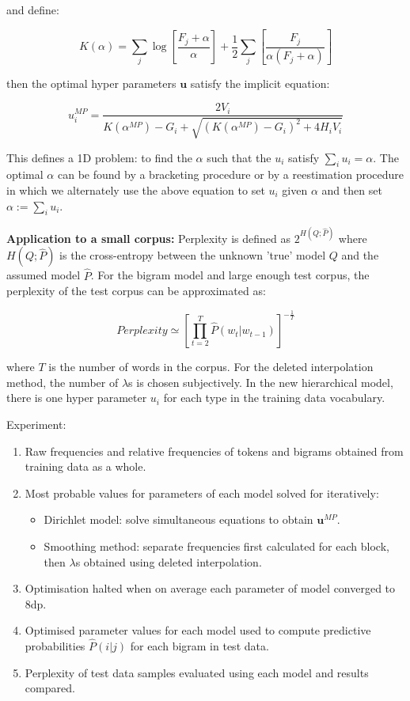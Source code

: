 \noindent and define:

\begin{equation}
K(\alpha)=\sum_{j}\log\left[\frac{F_{j}+\alpha}{\alpha}\right]+\frac{1}{2}\sum_{j}\left[\frac{F_{j}}{\alpha(F_{j}+\alpha)}\right]
\end{equation}

\noindent then the optimal hyper parameters $\boldsymbol{u}$ satisfy the implicit equation:

\begin{equation}
u_{i}^{MP}=\frac{2V_{i}}{K(\alpha^{MP})-G_{i}+\sqrt{(K(\alpha^{MP})-G_{i})^{2}+4H_{i}V_{i}}}
\end{equation}

\noindent This defines a 1D problem: to find the $\alpha$ such that the $u_{i}$ satisfy $\sum_{i}u_{i}=\alpha$. The optimal $\alpha$ can be found by a bracketing procedure or by a reestimation procedure in which we alternately use the above equation to set $u_{i}$ given $\alpha$ and then set $\alpha:=\sum_{i}u_{i}$.

\textbf{Application to a small corpus: } Perplexity is defined as $2^{H(Q;\hat{P})}$ where $H(Q;\hat{P})$ is the cross-entropy between the unknown 'true' model $Q$ and the assumed model $\hat{P}$. For the bigram model and large enough test corpus, the perplexity of the test corpus can be approximated as:

\begin{equation}
Perplexity\simeq\left[\prod_{t=2}^{T}\hat{P}(w_{t}|w_{t-1})\right]^{-\frac{1}{T}}
\end{equation}

\noindent where $T$ is the number of words in the corpus. For the deleted interpolation method, the number of $\lambda$s is chosen subjectively. In the new hierarchical model, there is one hyper parameter $u_{i}$ for each type in the training data vocabulary.

Experiment:
\begin{enumerate}
\item Raw frequencies and relative frequencies of tokens and bigrams obtained from training data as a whole.
\item Most probable values for parameters of each model solved for iteratively: 
\indent\begin{itemize}
 \item Dirichlet model: solve simultaneous equations to obtain $\boldsymbol{u}^{MP}$.
\item Smoothing method: separate frequencies first calculated for each block, then $\lambda$s obtained using deleted interpolation.
\end{itemize}
\item Optimisation halted when on average each parameter of model converged to 8dp.
\item Optimised parameter values for each model used to compute predictive probabilities $\hat{P}(i|j)$ for each bigram in test data.
\item Perplexity of test data samples evaluated using each model and results compared.
\end{enumerate}


